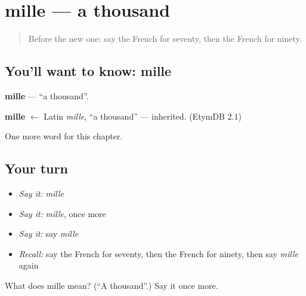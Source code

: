 \section[mille]{mille — a thousand}

\label{lesson:FR-C136-mille}



\begin{quote}
Before the new one: say the French for seventy, then the French for ninety.
\end{quote}

\subsection*{You'll want to know: mille}
\textbf{mille} — \textquotedblleft{}a thousand\textquotedblright{}.

\begin{cousinweb}
\textbf{mille} $\leftarrow$ Latin \emph{mille}, \textquotedblleft{}a thousand\textquotedblright{} — inherited. (EtymDB 2.1)
\end{cousinweb}

\begin{grammarlens}[title={What you've built}]
One more word for this chapter.
\end{grammarlens}

\subsection*{Your turn}
\begin{itemize}
\raggedright
  \item \emph{Say it:} \emph{mille}
  \item \emph{Say it:} \emph{mille}, once more
  \item \emph{Say it:} say \emph{mille}
  \item \emph{Recall:} say the French for seventy, then the French for ninety, then say \emph{mille} again
\end{itemize}

\begin{tcolorbox}[breakable,colback=teal!4,colframe=teal!35!black,title={Before you move on}]
What does mille mean? (\textquotedblleft{}A thousand\textquotedblright{}.) Say it once more.
\end{tcolorbox}
